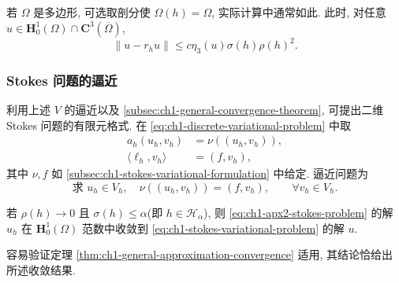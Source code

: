 \begin{Remark}
\label{rem:ch1-apx2-polygonal-domain}
若 $\Omega$ 是多边形, 可选取剖分使 $\Omega(h)=\Omega$, 实际计算中通常如此. 此时, 对任意 $u\in\mathbf H_0^1(\Omega)\cap\mathbf C^3(\overline\Omega)$,
\begin{equation}
\|u-r_hu\|\leq c\eta_3(u)\sigma(h)\rho(h)^2.
\label{eq:ch1-apx2-polygonal-error}
\end{equation}
\end{Remark}

\subsubsection{Stokes 问题的逼近}
\label{subsubsec:ch1-apx2-stokes}

利用上述 $V$ 的逼近以及 \ref{subsec:ch1-general-convergence-theorem}, 可提出二维 Stokes 问题的有限元格式. 在 \eqref{eq:ch1-discrete-variational-problem} 中取
\begin{equation}
\begin{aligned}
a_h(u_h,v_h)&=\nu((u_h,v_h)),\\
\langle\ell_h,v_h\rangle&=(f,v_h),
\end{aligned}
\label{eq:ch1-apx2-stokes-forms}
\end{equation}
其中 $\nu,f$ 如 \ref{subsec:ch1-stokes-variational-formulation} 中给定. 逼近问题为
\begin{equation}
\text{求 }u_h\in V_h,\quad
\nu((u_h,v_h))=(f,v_h),\qquad\forall v_h\in V_h.
\label{eq:ch1-apx2-stokes-problem}
\end{equation}

\begin{Proposition}
\label{prop:ch1-apx2-stokes-convergence}
若 $\rho(h)\to0$ 且 $\sigma(h)\leq\alpha$(即 $h\in\mathcal H_\alpha$), 则 \eqref{eq:ch1-apx2-stokes-problem} 的解 $u_h$ 在 $\mathbf H_0^1(\Omega)$ 范数中收敛到 \eqref{eq:ch1-stokes-variational-problem} 的解 $u$.
\end{Proposition}

\begin{Proof}
容易验证定理 \ref{thm:ch1-general-approximation-convergence} 适用, 其结论恰给出所述收敛结果.
\end{Proof}

